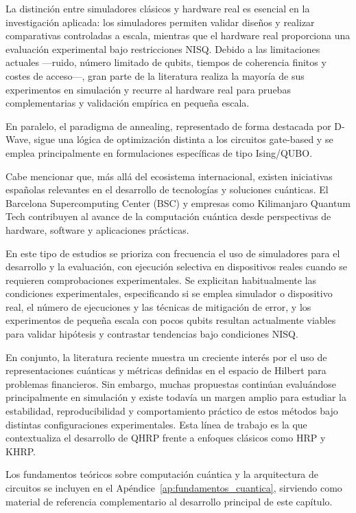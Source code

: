 La distinción entre simuladores clásicos y hardware real es esencial en la investigación aplicada: los simuladores permiten validar diseños y realizar comparativas controladas a escala, mientras que el hardware real proporciona una evaluación experimental bajo restricciones \gls{NISQ}. Debido a las limitaciones actuales —ruido, número limitado de qubits, tiempos de coherencia finitos y costes de acceso—, gran parte de la literatura realiza la mayoría de sus experimentos en simulación y recurre al hardware real para pruebas complementarias y validación empírica en pequeña escala. 

En paralelo, el paradigma de annealing, representado de forma destacada por D-Wave, sigue una lógica de optimización distinta a los circuitos gate-based y se emplea principalmente en formulaciones específicas de tipo Ising/\gls{QUBO}.

Cabe mencionar que, más allá del ecosistema internacional, existen iniciativas españolas relevantes en el desarrollo de tecnologías y soluciones cuánticas. El Barcelona Supercomputing Center (BSC) y empresas como Kilimanjaro Quantum Tech contribuyen al avance de la computación cuántica desde perspectivas de hardware, software y aplicaciones prácticas.

En este tipo de estudios se prioriza con frecuencia el uso de simuladores para el desarrollo y la evaluación, con ejecución selectiva en dispositivos reales cuando se requieren comprobaciones experimentales. Se explicitan habitualmente las condiciones experimentales, especificando si se emplea simulador o dispositivo real, el número de ejecuciones y las técnicas de mitigación de error, y los experimentos de pequeña escala con pocos qubits resultan actualmente viables para validar hipótesis y contrastar tendencias bajo condiciones NISQ.

En conjunto, la literatura reciente muestra un creciente interés por el uso de representaciones cuánticas y métricas definidas en el espacio de Hilbert para problemas financieros. Sin embargo, muchas propuestas continúan evaluándose principalmente en simulación y existe todavía un margen amplio para estudiar la estabilidad, reproducibilidad y comportamiento práctico de estos métodos bajo distintas configuraciones experimentales. Esta línea de trabajo es la que contextualiza el desarrollo de \gls{QHRP} frente a enfoques clásicos como \gls{HRP} y \gls{KHRP}.

Los fundamentos teóricos sobre computación cuántica y la arquitectura de circuitos se incluyen en el Apéndice~\ref{ap:fundamentos_cuantica}, sirviendo como material de referencia complementario al desarrollo principal de este capítulo.
